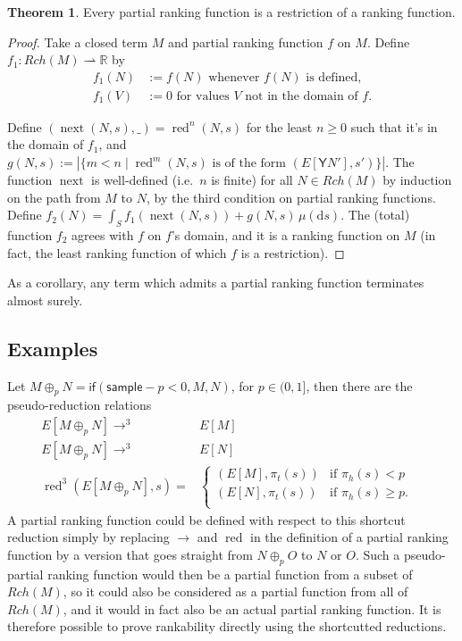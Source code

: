 \documentclass{article}
\newcommand{\tY}{\mathsf{Y}}
\newcommand{\tif}[3]{\mathsf{if}(#1, #2, #3)} %
\newcommand{\tsample}{\mathsf{sample}}
\DeclareMathOperator{\red}{red}
\DeclareMathOperator{\nnext}{next}
\theoremstyle{definition}
\theoremstyle{lemma}
\newtheorem{theorem}{Theorem}
\theoremstyle{remark}
\begin{document}
\begin{theorem} \label{thm:partial implies rankable}
Every partial ranking function is a restriction of a ranking function.
\end{theorem}
\begin{proof}
Take a closed term $M$ and partial ranking function $f$ on $M$. Define $f_1 : Rch(M) \rightharpoonup \mathbb R$ by
\begin{align*}
    f_1(N) & := f(N) \text{ whenever $f(N)$ is defined,} \\
    f_1(V) & := 0 \text{ for values $V$ not in the domain of $f$.}
\end{align*}

Define $(\nnext(N,s),\_) = \red^n(N,s)$ for the least $n \geq 0$ such that it's in the domain of $f_1$, and $g(N,s) := \left | \{m < n \mid \red^m(N,s) \text{ is of the form } (E[\tY N'],s') \} \right |$. 
The function $\nnext$ is well-defined (i.e.~$n$ is finite) for all $N \in Rch(M)$ by induction on the path from $M$ to $N$, by the third condition on partial ranking functions. Define $f_2(N) = \int_S f_1(\nnext(N,s)) + g(N,s) \, \mu(\mathrm d s)$. The (total) function $f_2$ agrees with $f$ on $f$'s domain, and it is a ranking function on $M$ (in fact, the least ranking function of which $f$ is a restriction).
\end{proof}


As a corollary, any term which admits a partial ranking function terminates almost surely.

\subsection{Examples}
Let $M \oplus_p N = \tif{\tsample - p < 0} M N$, for $p \in (0,1]$, then there are the pseudo-reduction relations
\begin{align*}
E[M \oplus_p N] \to^3 & E[M] & \\
E[M \oplus_p N] \to^3 & E[N] & \\
\red^3(E[M \oplus_p N], s) = & \left\{
    \begin{array}{ll}
        (E[M],\pi_t(s)) & \text{if } \pi_h(s) < p \\
        (E[N],\pi_t(s)) & \text{if } \pi_h(s) \geq p. \\
    \end{array} \right .
\end{align*}
A partial ranking function could be defined with respect to this shortcut reduction simply by replacing $\to$ and $\red$ in the definition of a partial ranking function by a version that goes straight from $N \oplus_p O$ to $N$ or $O$. Such a pseudo-partial ranking function would then be a partial function from a subset of $Rch(M)$, so it could also be considered as a partial function from all of $Rch(M)$, and it would in fact also be an actual partial ranking function. It is therefore possible to prove rankability directly using the shortcutted reductions.
\end{document}
